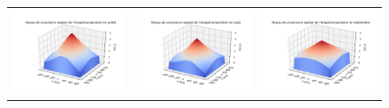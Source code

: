 \documentclass[a4paper,11pt]{article}
\numberwithin{equation}{section}
\begin{document}
\begin{figure}[H]
\hspace{-1.3cm}
\begin{tabular}{ccc}
	\includegraphics[scale=0.34]{images/kernel_evap_m7.png} & \includegraphics[scale=0.34]{images/kernel_evap_m8.png} & \includegraphics[scale=0.34]{images/kernel_evap_m9.png} \\ 

\end{tabular}
\end{figure}
\end{document}
